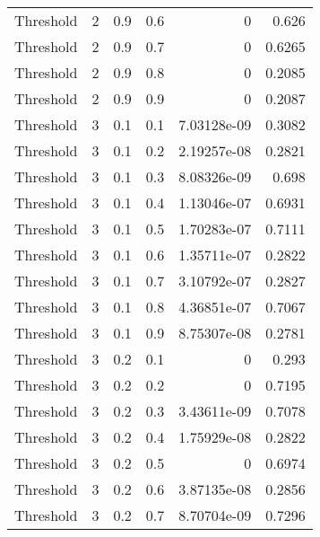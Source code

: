 \documentclass{article}
\begin{document}
\begin{longtable}[H]{lrrrrr}
 Threshold      &       2 &   0.9 &            0.6 &      0           &          0.626  \\
 Threshold      &       2 &   0.9 &            0.7 &      0           &          0.6265 \\
 Threshold      &       2 &   0.9 &            0.8 &      0           &          0.2085 \\
 Threshold      &       2 &   0.9 &            0.9 &      0           &          0.2087 \\
 Threshold      &       3 &   0.1 &            0.1 &      7.03128e-09 &          0.3082 \\
 Threshold      &       3 &   0.1 &            0.2 &      2.19257e-08 &          0.2821 \\
 Threshold      &       3 &   0.1 &            0.3 &      8.08326e-09 &          0.698  \\
 Threshold      &       3 &   0.1 &            0.4 &      1.13046e-07 &          0.6931 \\
 Threshold      &       3 &   0.1 &            0.5 &      1.70283e-07 &          0.7111 \\
 Threshold      &       3 &   0.1 &            0.6 &      1.35711e-07 &          0.2822 \\
 Threshold      &       3 &   0.1 &            0.7 &      3.10792e-07 &          0.2827 \\
 Threshold      &       3 &   0.1 &            0.8 &      4.36851e-07 &          0.7067 \\
 Threshold      &       3 &   0.1 &            0.9 &      8.75307e-08 &          0.2781 \\
 Threshold      &       3 &   0.2 &            0.1 &      0           &          0.293  \\
 Threshold      &       3 &   0.2 &            0.2 &      0           &          0.7195 \\
 Threshold      &       3 &   0.2 &            0.3 &      3.43611e-09 &          0.7078 \\
 Threshold      &       3 &   0.2 &            0.4 &      1.75929e-08 &          0.2822 \\
 Threshold      &       3 &   0.2 &            0.5 &      0           &          0.6974 \\
 Threshold      &       3 &   0.2 &            0.6 &      3.87135e-08 &          0.2856 \\
 Threshold      &       3 &   0.2 &            0.7 &      8.70704e-09 &          0.7296 \\

\end{longtable}
\end{document}
